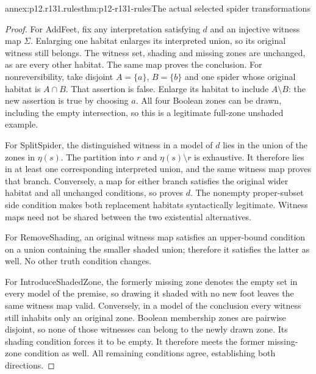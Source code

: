 \begin{annexitem}{annex:p12.r131.rules}{thm:p12-r131-rules}{The actual selected spider transformations}
\begin{proof}
For AddFeet, fix any interpretation satisfying $d$ and an injective
witness map $\Sigma$. Enlarging one habitat enlarges its interpreted
union, so its original witness still belongs. The witness set, shading
and missing zones are unchanged, as are every other habitat. The same
map proves the conclusion. For nonreversibility, take disjoint
$A=\{a\}$, $B=\{b\}$ and one spider whose original habitat is
$A\cap B$. That assertion is false. Enlarge its habitat to include
$A\setminus B$: the new assertion is true by choosing $a$.
All four Boolean zones can be drawn, including the empty intersection,
so this is a legitimate full-zone unshaded example.

For SplitSpider, the distinguished witness in a model of $d$ lies
in the union of the zones in $\eta(s)$. The partition into $r$ and
$\eta(s)\setminus r$ is exhaustive. It therefore lies in at least
one corresponding interpreted union, and the same witness map proves
that branch. Conversely, a map for either branch satisfies the original
wider habitat and all unchanged conditions, so proves $d$. The
nonempty proper-subset side condition makes both replacement habitats
syntactically legitimate. Witness maps need not be shared between the
two existential alternatives.

For RemoveShading, an original witness map satisfies an upper-bound
condition on a union containing the smaller shaded union; therefore
it satisfies the latter as well. No other truth condition changes.

For IntroduceShadedZone, the formerly missing zone denotes the empty
set in every model of the premise, so drawing it shaded with no new
foot leaves the same witness map valid. Conversely, in a model of the
conclusion every witness still inhabits only an original zone. Boolean
membership zones are pairwise disjoint, so none of those witnesses can
belong to the newly drawn zone. Its shading condition forces it to be
empty. It therefore meets the former missing-zone condition as well.
All remaining conditions agree, establishing both directions.
\end{proof}
\end{annexitem}

